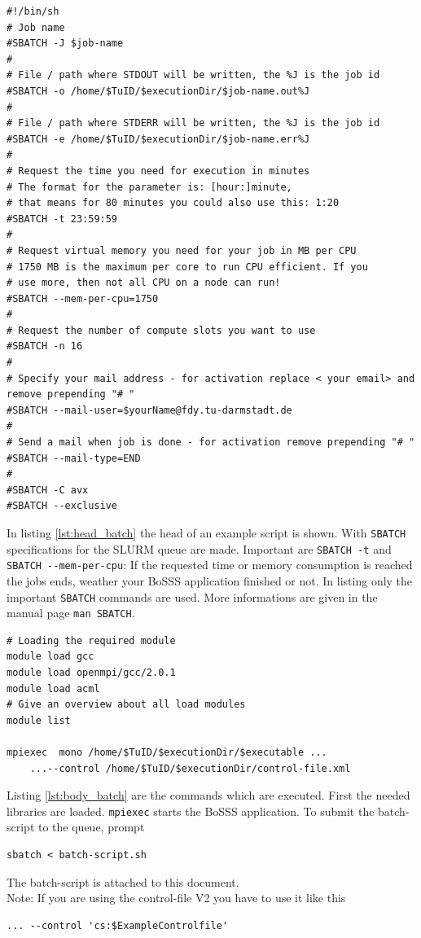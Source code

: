 \documentclass[11pt,twoside,a4paper]{fdyartcl}
\begin{document}
\noindent
\begin{minipage}{\linewidth}
\begin{lstlisting}[caption={Batch-script: head}, 
label={lst:head_batch}]
#!/bin/sh
# Job name
#SBATCH -J $job-name
#
# File / path where STDOUT will be written, the %J is the job id
#SBATCH -o /home/$TuID/$executionDir/$job-name.out%J
#
# File / path where STDERR will be written, the %J is the job id
#SBATCH -e /home/$TuID/$executionDir/$job-name.err%J
#
# Request the time you need for execution in minutes
# The format for the parameter is: [hour:]minute,
# that means for 80 minutes you could also use this: 1:20
#SBATCH -t 23:59:59
#
# Request virtual memory you need for your job in MB per CPU
# 1750 MB is the maximum per core to run CPU efficient. If you
# use more, then not all CPU on a node can run!
#SBATCH --mem-per-cpu=1750
#
# Request the number of compute slots you want to use
#SBATCH -n 16
#
# Specify your mail address - for activation replace < your email> and remove prepending "# "
#SBATCH --mail-user=$yourName@fdy.tu-darmstadt.de
#
# Send a mail when job is done - for activation remove prepending "# "
#SBATCH --mail-type=END
#
#SBATCH -C avx
#SBATCH --exclusive
\end{lstlisting}

\end{minipage}


In listing \ref{lst:head_batch} the head of an example script is shown. With \verb|SBATCH| specifications for the SLURM queue are made. Important are \verb|SBATCH -t| and \verb|SBATCH --mem-per-cpu|: If the requested time or memory consumption is reached the jobs ends, weather your BoSSS application finished or not. In listing only the important \verb|SBATCH| commands are used. More informations are given in the manual page \verb|man SBATCH|.

\noindent
\begin{minipage}{\linewidth}
\begin{lstlisting}[caption={Batch-script: body}, 
label={lst:body_batch}]
# Loading the required module
module load gcc
module load openmpi/gcc/2.0.1
module load acml
# Give an overview about all load modules
module list

mpiexec  mono /home/$TuID/$executionDir/$executable ...
	...--control /home/$TuID/$executionDir/control-file.xml
\end{lstlisting}
\end{minipage}

Listing \ref{lst:body_batch} are the commands which are executed. First the needed libraries are loaded. \verb|mpiexec| starts the BoSSS application. To submit the batch-script to the queue, prompt
\begin{verbatim}
sbatch < batch-script.sh
\end{verbatim}
The batch-script is attached to this document.\\
Note: If you are using the control-file V2 you have to use it like this
\begin{verbatim}
... --control 'cs:$ExampleControlfile' 
\end{verbatim}
\end{document}
